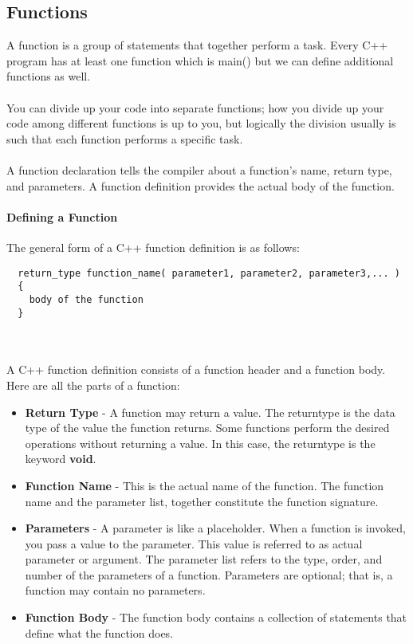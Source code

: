 \documentclass[11pt,fleqn]{book} %
\begin{document}
\subsection{Functions}
A function is a group of statements that together perform a task. Every C++ program has at least one function which is main() but we can define additional functions as well.\\ ~\\ 
You can divide up your code into separate functions; how you divide up your code among different functions is up to you, but logically the division usually is such that each function performs a specific task. ~\\ ~\\
A function declaration tells the compiler about a function's name, return type, and parameters. A function definition provides the actual body of the function.
\paragraph{Defining a Function}
The general form of a C++ function definition is as follows:
\begin{lstlisting}
  return_type function_name( parameter1, parameter2, parameter3,... ) 
  {
    body of the function
  }
\end{lstlisting} ~\\ ~\\
A C++ function definition consists of a function header and a function body. Here are all the parts of a function: ~\\
\begin{itemize}
\item \textbf{Return Type} - A function may return a value. The return\textunderscore type is the data type of the value the function returns. Some functions perform the desired operations without returning a value. In this case, the return\textunderscore type is the keyword \textbf{void}. \\
\item \textbf{Function Name} - This is the actual name of the function. The function name and the parameter list, together constitute the function signature.\\
\item \textbf{Parameters} - A parameter is like a placeholder. When a function is invoked, you pass a value to the parameter. This value is referred to as actual parameter or argument. The parameter list refers to the type, order, and number of the parameters of a function. Parameters are optional; that is, a function may contain no parameters.\\
\item \textbf{Function Body} - The function body contains a collection of statements that define what the function does. ~\\
\end{itemize}
\end{document}
